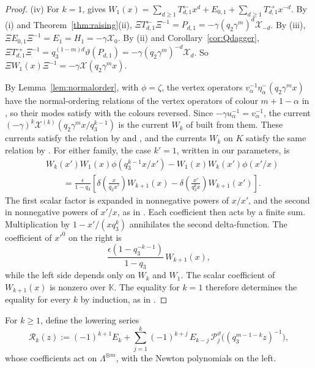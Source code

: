 \documentclass[11pt]{amsart}
\theoremstyle{definition}
\theoremstyle{remark}
\newcommand{\K}{\mathbb K}                       %
\newcommand{\La}{\Lambda}                        %
\newcommand{\Cartan}[1]{H_{#1}}                  %
\newcommand{\Newton}[1]{E_{#1}}                  %
\newcommand{\Pser}[1]{\mathcal P_{#1}}           %
\newcommand{\Xcur}{\mathcal X}                   %
\newcommand{\Xk}[1]{\mathcal X^{(#1)}}           %
\newcommand{\Rlast}[1]{\mathcal R_{#1}}          %
\begin{document}
\begin{proof}
(iv) For \(k=1\), \cite[(2.50)]{N3} gives
\(W_1(x)=\sum_{d\geq1}T^{\leftarrow}_{d,1}x^d+E_{0,1}+\sum_{d\geq1}T^{\rightarrow}_{d,1}x^{-d}\). By (i)
and Theorem~\ref{thm:raising}(ii), \(\Xi T^{\leftarrow}_{d,1}\Xi^{-1}=P_{d,1}=-\gamma(q_2\gamma^m)^d\Xcur_{-d}\).
By (iii), \(\Xi E_{0,1}\Xi^{-1}=\Newton{1}=\Cartan{1}=-\gamma\Xcur_0\). By (ii) and
Corollary~\ref{cor:Qdagger},
\(\Xi T^{\rightarrow}_{d,1}\Xi^{-1}=q_3^{(1-m)d}\vartheta(P_{d,1})
=-\gamma(q_2\gamma^m)^{-d}\Xcur_d\). So
\(\Xi W_1(x)\Xi^{-1}=-\gamma\Xcur(q_2\gamma^mx)\).

By Lemma~\ref{lem:normalorder}, with \(\phi=\zeta\), the vertex operators
\(v_\alpha^{-1}\eta^-_\alpha(q_2\gamma^mx)\) have the normal-ordering relations
of the vertex operators of colour \(m+1-\alpha\) in \cite[proof of Proposition~5.4]{N3}, so their
modes satisfy \cite[(5.1)]{N3} with the colours reversed. Since \(-\gamma u_\alpha^{-1}=v_\alpha^{-1}\),
the current \((-\gamma)^k\Xk{k}(q_2\gamma^mx/q_3^{k-1})\) is the current \(W_k\) of \cite[(5.4)]{N3}
built from them. These currents satisfy the relation \cite[(2.62)]{N3} by
\cite[Proposition~5.4]{N3} and \cite{Odake}, and the currents \(W_k\) on \(K\) satisfy the same relation by
\cite[Proposition~2.20 and Theorem~3.12]{N3}. For either family, the case
\(k'=1\), written in our parameters, is
\begin{align*}
 &W_k(x')W_1(x)\phi(q_3^{k-1}x/x')
   -W_1(x)W_k(x')\phi(x'/x)\\
 &\qquad=\frac{\epsilon}{1-q_3}
 \left[
 \delta\!\left(\frac{x}{q_3x'}\right)W_{k+1}(x)
 -\delta\!\left(\frac{x'}{q_3^kx}\right)W_{k+1}(x')
 \right].
\end{align*}
The first scalar factor is expanded in nonnegative powers of \(x/x'\),
and the second in nonnegative powers of \(x'/x\), as in
\cite[Remark~2.21]{N3}. Each coefficient then acts by a finite sum.
Multiplication by \(1-x'/(xq_3^k)\) annihilates the second delta-function.
The coefficient of \(x'^0\) on the right is
\[
 \frac{\epsilon(1-q_3^{-k-1})}{1-q_3}\,W_{k+1}(x),
\]
while the left side depends only on \(W_k\) and \(W_1\).
The scalar coefficient of \(W_{k+1}(x)\) is nonzero over \(\K\). The equality for \(k=1\) therefore
determines the equality for every \(k\) by induction, as in
\cite[(4.32)--(4.33)]{N3}.
\end{proof}

For \(k\geq1\), define the lowering series
\begin{equation}\label{eq:Rk}
 \Rlast{k}(z):=(-1)^{k+1}\Newton{k}+\sum_{j=1}^k(-1)^{k+j}\,\Newton{k-j}\,
 \Pser{j}^\vartheta\bigl((q_3^{m-1-k}z)^{-1}\bigr),
\end{equation}
whose coefficients act on \(\La^{\otimes m}\), with the Newton polynomials on the left.
\end{document}
